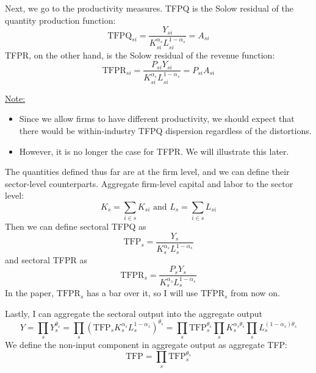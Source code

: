 \documentclass[12pt]{article}
\begin{document}
Next, we go to the productivity measures. TFPQ is the Solow residual of the quantity production function:
\begin{equation}
	\text{TFPQ}_{si} = \frac{Y_{si}}{K_{si}^{\alpha_s}L_{si}^{1-\alpha_s}}= A_{si}
\end{equation}
TFPR, on the other hand, is the Solow residual of the revenue function:
\begin{equation} \label{eq:TFPR}
	\text{TFPR}_{si} = \frac{P_{si} Y_{si}}{K_{si}^{\alpha_s}L_{si}^{1-\alpha_s}} = P_{si} A_{si}
\end{equation}

\underline{Note:}
\begin{itemize}
	\item Since we allow firms to have different productivity, we should expect that there would be within-industry TFPQ dispersion regardless of the distortions.
	\item However, it is no longer the case for TFPR. We will illustrate this later. 
\end{itemize}

The quantities defined thus far are at the firm level, and we can define their sector-level counterparts. Aggregate firm-level capital and labor to the sector level:
\[K_s = \sum_{i \in s} K_{si} \text{ and } L_s = \sum_{i \in s} L_{si} \]
Then we can define sectoral TFPQ as 
\begin{equation}
	\text{TFP}_s = \frac{Y_s}{K_s^{\alpha_s}L_s^{1-\alpha_s}}
\end{equation}
and sectoral TFPR as
\begin{equation}
	\text{TFPR}_s = \frac{P_{s} Y_{s}}{K_s^{\alpha_s}L_s^{1-\alpha_s}}
\end{equation}
In the paper, $\text{TFPR}_s$ has a bar over it, so I will use $\overline{\text{TFPR}}_s$ from now on. 

Lastly, I can aggregate the sectoral output into the aggregate output 
\[Y = \prod_{s} Y_s^{\theta_s} = \prod_s \left(\text{TFP}_s K_s^{\alpha_s} L_s^{1-\alpha_s}\right)^{\theta_s} = \prod_s \text{TFP}_s^{\theta_s} \prod_s K_s^{\alpha_s \theta_s} \prod_s L_s^{(1-\alpha_s)\theta_s}\]
We define the non-input component in aggregate output as aggregate TFP:
\begin{equation}
	\text{TFP} = \prod_s \text{TFP}_s^{\theta_s}
\end{equation} 
\end{document}
